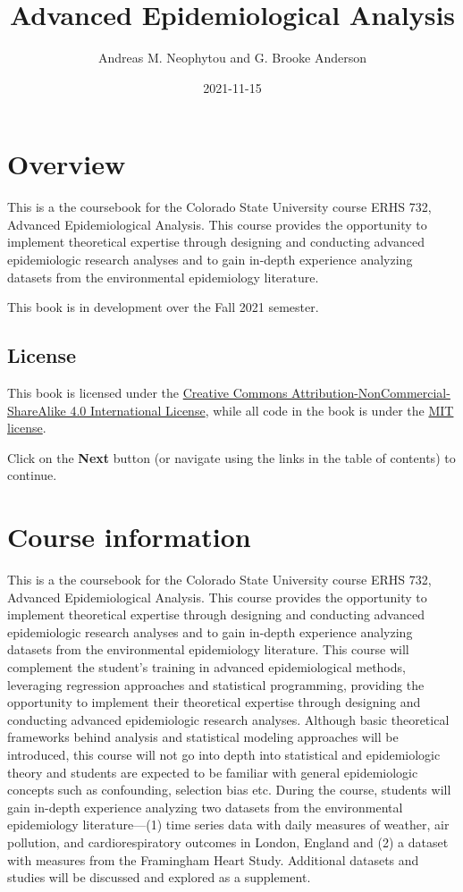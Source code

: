 \documentclass[
]{book}
\title{Advanced Epidemiological Analysis}
\author{Andreas M. Neophytou and G. Brooke Anderson}
\date{2021-11-15}
\begin{document}
\maketitle

{
\setcounter{tocdepth}{1}
\tableofcontents
}
\hypertarget{overview}{%
\chapter{Overview}\label{overview}}

This is a the coursebook for the Colorado State University course ERHS 732,
Advanced Epidemiological Analysis. This course provides the opportunity to
implement theoretical expertise through designing and conducting advanced
epidemiologic research analyses and to gain in-depth experience analyzing
datasets from the environmental epidemiology literature.

This book is in development over the Fall 2021 semester.

\hypertarget{license}{%
\section{License}\label{license}}

This book is licensed under the \href{https://creativecommons.org/licenses/by-nc-sa/4.0/}{Creative Commons
Attribution-NonCommercial-ShareAlike 4.0 International
License}, while all code in
the book is under the \href{https://opensource.org/licenses/MIT}{MIT license}.

Click on the \textbf{Next} button (or navigate using the links in the table of
contents) to continue.

\hypertarget{courseinfo}{%
\chapter{Course information}\label{courseinfo}}

This is a the coursebook for the Colorado State University course ERHS 732,
Advanced Epidemiological Analysis. This course provides the opportunity to
implement theoretical expertise through designing and conducting advanced
epidemiologic research analyses and to gain in-depth experience analyzing
datasets from the environmental epidemiology literature. This course will
complement the student's training in advanced epidemiological methods,
leveraging regression approaches and statistical programming, providing the
opportunity to implement their theoretical expertise through designing and
conducting advanced epidemiologic research analyses. Although basic theoretical frameworks behind analysis and statistical modeling approaches will be introduced, this course will not go into depth into statistical and epidemiologic theory and students are expected to be familiar with general epidemiologic concepts such as confounding, selection bias etc. During the course,
students will gain in-depth experience analyzing two datasets from the
environmental epidemiology literature---(1) time series data with daily measures
of weather, air pollution, and cardiorespiratory outcomes in London, England and
(2) a dataset with measures from the Framingham Heart Study. Additional datasets
and studies will be discussed and explored as a supplement.
\end{document}
